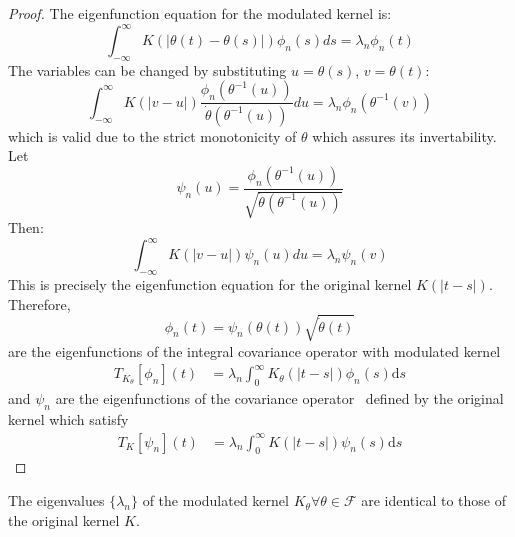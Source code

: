 \documentclass{mc}
\newcommand{\mathd}{\mathrm{d}}
\begin{document}
\begin{proof}
  The eigenfunction equation for the modulated kernel is:
  \begin{equation}
    \int_{- \infty}^{\infty} K (| \theta (t) - \theta (s) |) \phi_n (s) ds =
    \lambda_n \phi_n (t)
  \end{equation}
  The variables can be changed by substituting $u = \theta (s)$, $v = \theta
  (t)$:
  \begin{equation}
    \int_{- \infty}^{\infty} K (|v - u|) \frac{\phi_n (\theta^{- 1}
    (u))}{\dot{\theta} (\theta^{- 1} (u))} du = \lambda_n \phi_n (\theta^{- 1}
    (v))
  \end{equation}
  which is valid due to the strict monotonicity of $\theta$ which assures its
  invertability. Let
  \begin{equation}
    \psi_n (u) = \frac{\phi_n (\theta^{- 1} (u))}{\sqrt{\dot{\theta}
    (\theta^{- 1} (u))}}
  \end{equation}
  Then:
  \begin{equation}
    \int_{- \infty}^{\infty} K (|v - u|) \psi_n (u) du = \lambda_n \psi_n (v)
  \end{equation}
  This is precisely the eigenfunction equation for the original kernel $K (|t
  - s|)$. Therefore,
  \begin{equation}
    \phi_n (t) = \psi_n (\theta (t)) \sqrt{\dot{\theta} (t)}
  \end{equation}
  are the eigenfunctions of the integral covariance operator with modulated
  kernel
  \begin{equation}
    \begin{array}{ll}
      T_{K_{\theta}} [\phi_n] (t) & = \lambda_n \int_0^{\infty} K_{\theta} (|
      t - s |) \phi_n (s) \mathd s
    \end{array}
  \end{equation}
  and $\psi_n$ are the eigenfunctions of the covariance operator \ defined by
  the original kernel which satisfy
  \begin{equation}
    \begin{array}{ll}
      T_K [\psi_n] (t) & = \lambda_n \int_0^{\infty} K  (| t - s |) \psi_n (s)
      \mathd s
    \end{array}
  \end{equation}
  
\end{proof}

\begin{corollary}
  The eigenvalues $\{\lambda_n \}$ of the modulated kernel $K_{\theta} \forall
  \theta \in \mathcal{F}$ are identical to those of the original kernel $K$.
\end{corollary}
\end{document}
